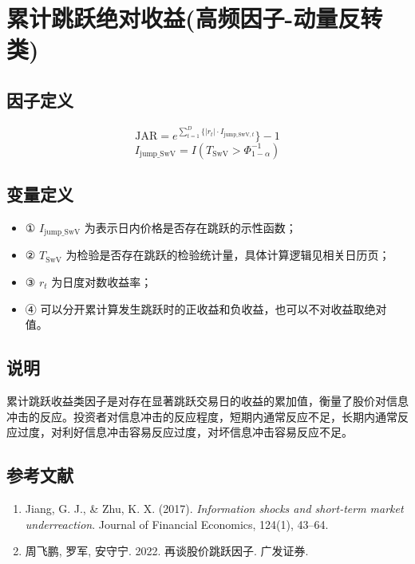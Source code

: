 \documentclass{article}
\begin{document}
\section{累计跳跃绝对收益(高频因子-动量反转类)}

\subsection{因子定义}
\begin{equation}
    \mathrm{JAR} = e^{\sum_{t=1}^{D} \{|r_t| \cdot I_{\mathrm{jump\_SwV}, t}}\} - 1
\end{equation}
\begin{equation}
    I_{\mathrm{jump\_SwV}} = I(T_{\mathrm{SwV}} > \Phi^{-1}_{1-\alpha})
\end{equation}

\subsection{变量定义}
\begin{itemize}
    \item ① \( I_{\mathrm{jump\_SwV}} \) 为表示日内价格是否存在跳跃的示性函数；
    \item ② \( T_{\mathrm{SwV}} \) 为检验是否存在跳跃的检验统计量，具体计算逻辑见相关日历页；
    \item ③ \( r_t \) 为日度对数收益率；
    \item ④ 可以分开累计算发生跳跃时的正收益和负收益，也可以不对收益取绝对值。
\end{itemize}

\subsection{说明}
累计跳跃收益类因子是对存在显著跳跃交易日的收益的累加值，衡量了股价对信息冲击的反应。投资者对信息冲击的反应程度，短期内通常反应不足，长期内通常反应过度，对利好信息冲击容易反应过度，对坏信息冲击容易反应不足。

\subsection{参考文献}
\begin{enumerate}
    \item Jiang, G. J., \& Zhu, K. X. (2017). \textit{Information shocks and short-term market underreaction}. Journal of Financial Economics, 124(1), 43–64.
    \item 周飞鹏, 罗军, 安守宁. 2022. 再谈股价跳跃因子. 广发证券.
\end{enumerate}
\end{document}
